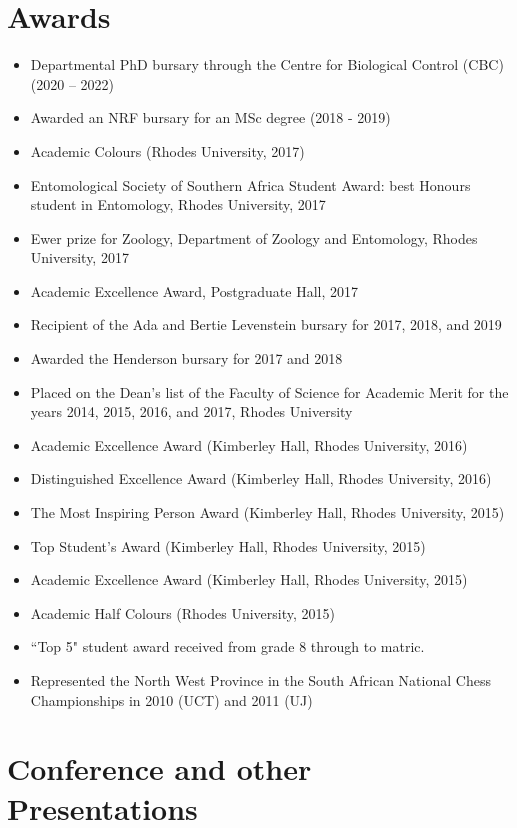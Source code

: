 \documentclass{article}
\begin{document}
\section{Awards}
\begin{itemize}

\item Departmental PhD bursary through the Centre for Biological Control (CBC) (2020 – 2022)
\item Awarded an NRF bursary for an MSc degree (2018 - 2019)
\item Academic Colours (Rhodes University, 2017)
\item Entomological Society of Southern Africa Student Award: best Honours student in Entomology, Rhodes University, 2017
\item Ewer prize for Zoology, Department of Zoology and Entomology, Rhodes University, 2017
\item Academic Excellence Award, Postgraduate Hall, 2017
\item Recipient of the Ada and Bertie Levenstein bursary for 2017, 2018, and 2019
\item Awarded the Henderson bursary for 2017 and 2018
\item Placed on the Dean’s list of the Faculty of Science for Academic Merit for the years 2014, 2015, 2016, and 2017, Rhodes University
\item Academic Excellence Award (Kimberley Hall, Rhodes University, 2016)
\item Distinguished Excellence Award (Kimberley Hall, Rhodes University, 2016)
\item The Most Inspiring Person Award (Kimberley Hall, Rhodes University, 2015)
\item Top Student’s Award (Kimberley Hall, Rhodes University, 2015)
\item Academic Excellence Award (Kimberley Hall, Rhodes University, 2015)
\item Academic Half Colours (Rhodes University, 2015)
\item ``Top 5" student award received from grade 8 through to matric.
\item Represented the North West Province in the South African National Chess Championships in 2010 (UCT) and 2011 (UJ)

\end{itemize}

\section{Conference and other Presentations}
\end{document}
